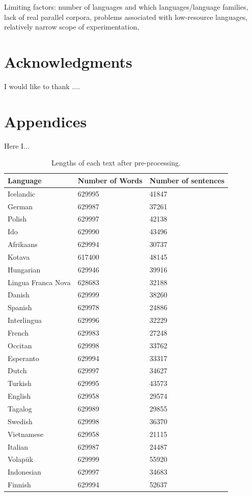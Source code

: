 \documentclass[12pt,a4paper]{article}
\numberwithin{figure}{section}
\numberwithin{table}{section}
\numberwithin{definition}{section}
\begin{document}
Limiting factors: number of languages and which languages/language families, lack of real parallel corpora, problems associated with low-resource languages, relatively narrow scope of experimentation,

\newpage
\section{Acknowledgments}
\label{sec:acknowledgments}
I would like to thank ....

\newpage
\printbibliography

\newpage
\section{Appendices}
\label{sec:appendices}

Here I...

\begin{table}[h!]
  \centering
  \renewcommand{\arraystretch}{1.5}
  \begin{tabular} {|p{3cm}|p{3cm}|p{3.5cm}|}
  \hline
  \textbf{Language} & \textbf{Number of Words} & \textbf{Number of sentences} \\
  \hline
  Icelandic & 629995 & 41847 \\
  German & 629987 & 37261 \\
  Polish & 629997 & 42138 \\
  Ido & 629990 & 43496 \\
  Afrikaans & 629994 & 30737 \\
  Kotava & 617400 & 48145 \\
  Hungarian & 629946 & 39916 \\
  Lingua Franca Nova & 628683 & 32188 \\
  Danish & 629999 & 38260 \\
  Spanish & 629978 & 24886 \\
  Interlingua & 629996 & 32229 \\
  French & 629983 & 27248 \\
  Occitan & 629998 & 33762 \\
  Esperanto & 629994 & 33317 \\
  Dutch & 629997 & 34627 \\
  Turkish & 629995 & 43573 \\
  English & 629958 & 29574 \\
  Tagalog & 629989 & 29855 \\
  Swedish & 629998 & 36370 \\
  Vietnamese & 629958 & 21115 \\
  Italian & 629987 & 24487 \\
  Volapük & 629999 & 55920 \\
  Indonesian & 629997 & 34683 \\
  Finnish & 629994 & 52637 \\
  \hline
  \end{tabular}
\caption{Lengths of each text after pre-processing.}
\label{tbl:preprocessedtexts}
\end{table}

\end{document}
